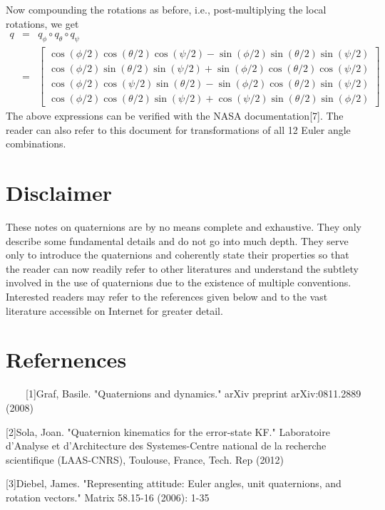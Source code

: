 \documentclass{article}
\begin{document}
 	Now compounding the rotations as before, i.e., post-multiplying the local rotations, we get
 	\begin{eqnarray}
 		q &=& q_{\phi}\circ q_{\theta}\circ q_{\psi}\\
 		 &=& \begin{bmatrix}
 		 \cos(\phi/2)\cos(\theta/2)\cos(\psi/2)-\sin(\phi/2)\sin(\theta/2)\sin(\psi/2)\\
 		 \cos(\phi/2)\sin(\theta/2)\sin(\psi/2)+\sin(\phi/2)\cos(\theta/2)\cos(\psi/2)\\
 		 \cos(\phi/2)\cos(\psi/2)\sin(\theta/2)-\sin(\phi/2)\cos(\theta/2)\sin(\psi/2)\\
 		 \cos(\phi/2)\cos(\theta/2)\sin(\psi/2)+\cos(\psi/2)\sin(\theta/2)\sin(\phi/2)
 		 \end{bmatrix}
 	\end{eqnarray}
 	The above expressions can be verified with the NASA documentation[7]. The reader can also refer to this document for transformations of all 12 Euler angle combinations.
 	
 
 
 \section*{Disclaimer}
 These notes on quaternions are by no means complete and exhaustive. They only describe some fundamental details and do not go into much depth. They serve only to introduce the quaternions and coherently state their properties so that the reader can now readily refer to other literatures and understand the subtlety involved in the use of quaternions due to the existence of multiple conventions. Interested readers may refer to the references given below and to the vast literature accessible on Internet for greater detail.
 
 \section*{Refernences}
 
 \ \ \ \ [1]Graf, Basile. "Quaternions and dynamics." arXiv preprint arXiv:0811.2889 (2008)
 
 [2]Sola, Joan. "Quaternion kinematics for the error-state KF." Laboratoire d’Analyse et d’Architecture des Systemes-Centre national de la recherche scientifique (LAAS-CNRS), Toulouse, France, Tech. Rep (2012)
 
 [3]Diebel, James. "Representing attitude: Euler angles, unit quaternions, and rotation vectors." Matrix 58.15-16 (2006): 1-35
 
\end{document}

